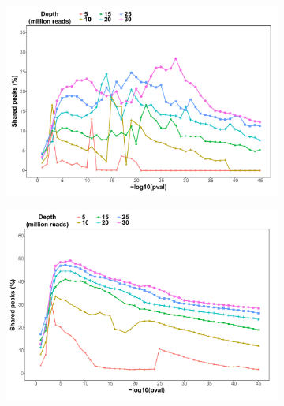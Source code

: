 \begin{figure}[htbp]
\centering
\begin{subfigure}{0.5\textwidth}
\centering
\includegraphics[width=\textwidth]{./Results1/pdfs/ATAC_Core_fresh_CTL2_CD4_shared_peaks_IDR_vs_pval}
\caption{\textbf{}}
\end{subfigure}%
\begin{subfigure}{0.5\textwidth}
\centering
\includegraphics[width=\textwidth]{./Results1/pdfs/ATAC_Core_fresh_CTL2_CD14_shared_peaks_IDR_vs_pval}
\caption{\textbf{}}
\end{subfigure} \\
\begin{subfigure}{0.65\textwidth}
\centering

\end{subfigure}
\end{figure}

